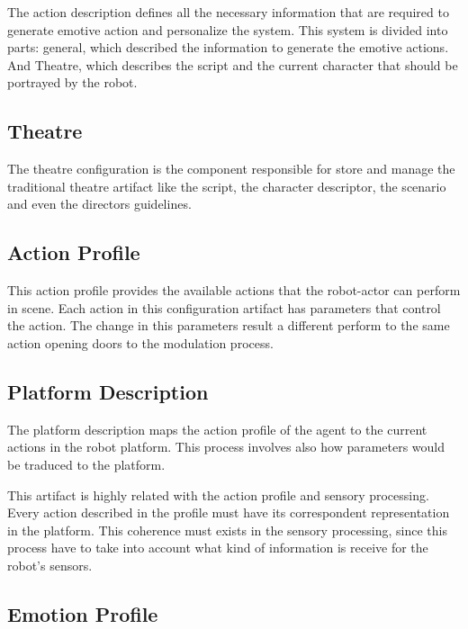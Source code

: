 The action description defines all the necessary information that are required to generate emotive action and personalize the system. This system is divided into parts: general, which described the information to generate the emotive actions. And Theatre, which describes the script and the current character that should be portrayed by 
the robot.

\subsection{Theatre}
The theatre configuration is the component responsible for store and manage the traditional theatre artifact like the script, the character descriptor, the scenario and even the directors guidelines.

\subsection{Action Profile}
This action profile provides the available actions that the robot-actor can perform in scene. Each action in this configuration artifact has parameters that control the action. The  change in this parameters result a different perform to the same action opening doors to the modulation process.


\subsection{Platform Description}
The platform description maps the action profile of the agent to the current actions in the robot platform. This process involves also how parameters would be traduced to the platform.

This artifact is highly related with the action profile and sensory processing. Every action described in the profile must have its correspondent representation in the platform. This coherence must exists in the sensory processing, since this process have to take into account what kind of information is receive for the robot's sensors.

\subsection{Emotion Profile}

